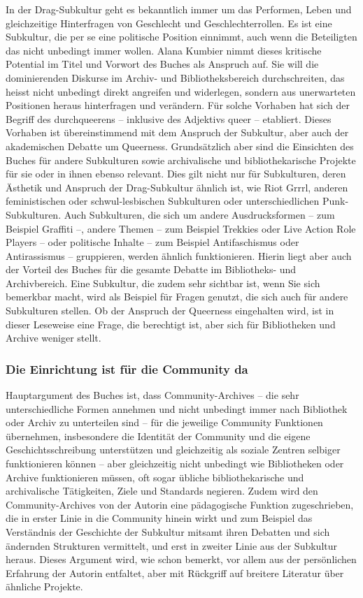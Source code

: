 \documentclass[a4paper,
fontsize=11pt,
oneside,
numbers=noperiodatend,
parskip=half-,
bibliography=totoc,
final
]{scrartcl}
\begin{document}
In der Drag-Subkultur geht es bekanntlich immer um das Performen, Leben
und gleichzeitige Hinterfragen von Geschlecht und Geschlechterrollen. Es
ist eine Subkultur, die per se eine politische Position einnimmt, auch
wenn die Beteiligten das nicht unbedingt immer wollen. Alana Kumbier
nimmt dieses kritische Potential im Titel und Vorwort des Buches als
Anspruch auf. Sie will die dominierenden Diskurse im Archiv- und
Bibliotheksbereich durchschreiten, das heisst nicht unbedingt direkt
angreifen und widerlegen, sondern aus unerwarteten Positionen heraus
hinterfragen und verändern. Für solche Vorhaben hat sich der Begriff des
durchqueerens -- inklusive des Adjektivs queer -- etabliert. Dieses
Vorhaben ist übereinstimmend mit dem Anspruch der Subkultur, aber auch
der akademischen Debatte um Queerness. Grundsätzlich aber sind die
Einsichten des Buches für andere Subkulturen sowie archivalische und
bibliothekarische Projekte für sie oder in ihnen ebenso relevant. Dies
gilt nicht nur für Subkulturen, deren Ästhetik und Anspruch der
Drag-Subkultur ähnlich ist, wie Riot Grrrl, anderen feministischen oder
schwul-lesbischen Subkulturen oder unterschiedlichen Punk-Subkulturen.
Auch Subkulturen, die sich um andere Ausdrucksformen -- zum Beispiel
Graffiti --, andere Themen -- zum Beispiel Trekkies oder Live Action
Role Players -- oder politische Inhalte -- zum Beispiel Antifaschismus
oder Antirassismus -- gruppieren, werden ähnlich funktionieren. Hierin
liegt aber auch der Vorteil des Buches für die gesamte Debatte im
Bibliotheks- und Archivbereich. Eine Subkultur, die zudem sehr sichtbar
ist, wenn Sie sich bemerkbar macht, wird als Beispiel für Fragen
genutzt, die sich auch für andere Subkulturen stellen. Ob der Anspruch
der Queerness eingehalten wird, ist in dieser Leseweise eine Frage, die
berechtigt ist, aber sich für Bibliotheken und Archive weniger stellt.

\subsubsection{Die Einrichtung ist für die Community
da}\label{die-einrichtung-ist-fuxfcr-die-community-da}

Hauptargument des Buches ist, dass Community-Archives -- die sehr
unterschiedliche Formen annehmen und nicht unbedingt immer nach
Bibliothek oder Archiv zu unterteilen sind -- für die jeweilige
Community Funktionen übernehmen, insbesondere die Identität der
Community und die eigene Geschichtsschreibung unterstützen und
gleichzeitig als soziale Zentren selbiger funktionieren können -- aber
gleichzeitig nicht unbedingt wie Bibliotheken oder Archive funktionieren
müssen, oft sogar übliche bibliothekarische und archivalische
Tätigkeiten, Ziele und Standards negieren. Zudem wird den
Community-Archives von der Autorin eine pädagogische Funktion
zugeschrieben, die in erster Linie in die Community hinein wirkt und zum
Beispiel das Verständnis der Geschichte der Subkultur mitsamt ihren
Debatten und sich ändernden Strukturen vermittelt, und erst in zweiter
Linie aus der Subkultur heraus. Dieses Argument wird, wie schon bemerkt,
vor allem aus der persönlichen Erfahrung der Autorin entfaltet, aber mit
Rückgriff auf breitere Literatur über ähnliche Projekte.
\end{document}
